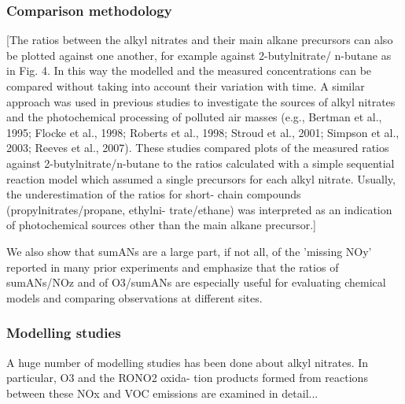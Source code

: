 \documentclass[11pt,a4paper]{article}
\begin{document}
\subsubsection{Comparison methodology}
\citep{Sommariva2008}
[The ratios between the alkyl nitrates and their
main alkane precursors can also be plotted against one another, for example against 2-butylnitrate/ n-butane as in Fig. 4. In this way the modelled and the measured concentrations can be compared without taking into account their variation with time. A similar approach was used in previous studies to investigate the sources of alkyl nitrates and the photochemical processing of polluted air masses (e.g., Bertman et al., 1995; Flocke et al., 1998; Roberts et al., 1998; Stroud et al., 2001; Simpson et al., 2003; Reeves et al., 2007). These studies compared plots of the measured ratios against 2-butylnitrate/n-butane to the ratios calculated with a simple sequential reaction model which assumed a single precursors for each alkyl nitrate. Usually, the underestimation of the ratios for short- chain compounds (propylnitrates/propane, ethylni- trate/ethane) was interpreted as an indication of photochemical sources other than the main alkane precursor.]

\citep{Day2003}
We also show that sumANs are a large part, if not all, of the 'missing NOy' reported in many prior experiments and emphasize that the ratios of sumANs/NOz and of O3/sumANs are especially useful for evaluating chemical models and comparing observations at different sites.

\subsubsection{Modelling studies}
A huge number of modelling studies has been done about alkyl nitrates. In particular, O3 and the RONO2 oxida- tion products formed from reactions between these NOx and VOC emissions are examined in detail...
\end{document}
